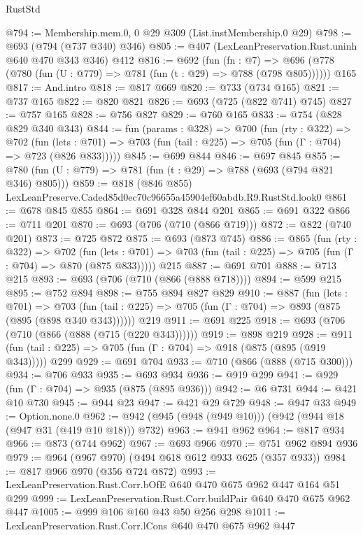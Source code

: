 \begin{lexlean}{RustStd}
\begin{coremodule}
@794 := Membership.mem.{0, 0} @29 @309 (List.instMembership.{0} @29)
@798 := @693 (@794 (@737 @340) @346)
@805 := @407 (LexLeanPreservation.Rust.uninh @640 @470 @343 @346) @412
@816 := @692
    (fun (fn : @7) =>
    @696 (@778 (@780 (fun (U : @779) => @781 (fun (t : @29) => @788 (@798 @805))))))
    @165
@817 := And.intro
@818 := @817 @669
@820 := @733 (@734 @165)
@821 := @737 @165
@822 := @820 @821
@826 := @693 (@725 (@822 @741) @745)
@827 := @757 @165
@828 := @756 @827
@829 := @760 @165
@833 := @754 (@828 @829 @340 @343)
@844 := fun (params : @328) =>
  @700
    (fun (rty : @322) =>
    @702
      (fun (lets : @701) => @703 (fun (tail : @225) => @705 (fun (Γ : @704) => @723 (@826 @833)))))
@845 := @699 @844
@846 := @697 @845
@855 := @780 (fun (U : @779) => @781 (fun (t : @29) => @788 (@693 (@794 @821 @346) @805)))
@859 := @818 (@846 @855) LexLeanPreserve.Caded85d0ec70c96655a45904ef60abdb.R9.RustStd.look0
@861 := @678 @845 @855
@864 := @691 @328 @844 @201
@865 := @691 @322
@866 := @711 @201
@870 := @693 (@706 (@710 (@866 @719)))
@872 := @822 (@740 @201)
@873 := @725 @872
@875 := @693 (@873 @745)
@886 := @865
    (fun (rty : @322) =>
    @702
      (fun (lets : @701) => @703 (fun (tail : @225) => @705 (fun (Γ : @704) => @870 (@875 @833)))))
    @215
@887 := @691 @701
@888 := @713 @215
@893 := @693 (@706 (@710 (@866 (@888 @718))))
@894 := @599 @215
@895 := @752 @894
@898 := @755 @894 @827 @829
@910 := @887
    (fun (lets : @701) =>
    @703 (fun (tail : @225) => @705 (fun (Γ : @704) => @893 (@875 (@895 (@898 @340 @343))))))
    @219
@911 := @691 @225
@918 := @693 (@706 (@710 (@866 (@888 (@715 (@220 @343))))))
@919 := @898 @219
@928 := @911 (fun (tail : @225) => @705 (fun (Γ : @704) => @918 (@875 (@895 (@919 @343))))) @299
@929 := @691 @704
@933 := @710 (@866 (@888 (@715 @300)))
@934 := @706 @933
@935 := @693 @934
@936 := @919 @299
@941 := @929 (fun (Γ : @704) => @935 (@875 (@895 @936)))
@942 := @6 @731
@944 := @421 @10 @730
@945 := @944 @23
@947 := @421 @29 @729
@948 := @947 @33
@949 := Option.none.{0}
@962 := @942 (@945 (@948 (@949 @10))) (@942 (@944 @18 (@947 @31 (@419 @10 @18))) @732)
@963 := @941 @962
@964 := @817 @934
@966 := @873 (@744 @962)
@967 := @693 @966
@970 := @751 @962 @894 @936
@979 := @964 (@967 @970) (@494 @618 @612 @933 @625 (@357 @933))
@984 := @817 @966 @970 (@356 @724 @872)
@993 := LexLeanPreservation.Rust.Corr.bOfE @640 @470 @675 @962 @447 @164 @51 @299
@999 := LexLeanPreservation.Rust.Corr.buildPair @640 @470 @675 @962 @447
@1005 := @999 @106 @160 @43 @50 @256 @298
@1011 := LexLeanPreservation.Rust.Corr.lCons @640 @470 @675 @962 @447

\end{coremodule}
\end{lexlean}
